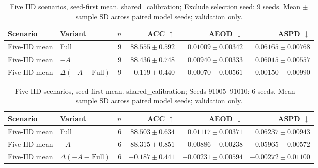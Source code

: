 \begin{table}[t]
\centering
\small
\caption{Five IID scenarios, seed-first mean. shared\_calibration; Exclude selection seed: 9 seeds. Mean $\pm$ sample SD across paired model seeds; validation only.}
\begin{tabular}{llrrrr}
\toprule
Scenario & Variant & $n$ & ACC $\uparrow$ & AEOD $\downarrow$ & ASPD $\downarrow$ \\
\midrule
Five-IID mean & Full & 9 & $88.555 \pm 0.592$ & $0.01009 \pm 0.00342$ & $0.06165 \pm 0.00768$ \\
Five-IID mean & $-A$ & 9 & $88.436 \pm 0.748$ & $0.00940 \pm 0.00333$ & $0.06015 \pm 0.00557$ \\
Five-IID mean & $\Delta(-A-\mathrm{Full})$ & 9 & $-0.119 \pm 0.440$ & $-0.00070 \pm 0.00561$ & $-0.00150 \pm 0.00990$ \\
\bottomrule
\end{tabular}
\end{table}

\begin{table}[t]
\centering
\small
\caption{Five IID scenarios, seed-first mean. shared\_calibration; Seeds 91005–91010: 6 seeds. Mean $\pm$ sample SD across paired model seeds; validation only.}
\begin{tabular}{llrrrr}
\toprule
Scenario & Variant & $n$ & ACC $\uparrow$ & AEOD $\downarrow$ & ASPD $\downarrow$ \\
\midrule
Five-IID mean & Full & 6 & $88.503 \pm 0.634$ & $0.01117 \pm 0.00371$ & $0.06237 \pm 0.00943$ \\
Five-IID mean & $-A$ & 6 & $88.315 \pm 0.851$ & $0.00886 \pm 0.00238$ & $0.05965 \pm 0.00572$ \\
Five-IID mean & $\Delta(-A-\mathrm{Full})$ & 6 & $-0.187 \pm 0.441$ & $-0.00231 \pm 0.00594$ & $-0.00272 \pm 0.01100$ \\
\bottomrule
\end{tabular}
\end{table}
